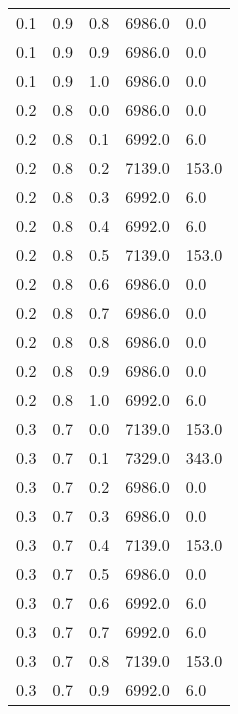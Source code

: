 \begin{longtable}{ l | l | l | l | l}
      0.1&          0.9&          0.8&       6986.0&          0.0\\
      0.1&          0.9&          0.9&       6986.0&          0.0\\
      0.1&          0.9&          1.0&       6986.0&          0.0\\
      0.2&          0.8&          0.0&       6986.0&          0.0\\
      0.2&          0.8&          0.1&       6992.0&          6.0\\
      0.2&          0.8&          0.2&       7139.0&        153.0\\
      0.2&          0.8&          0.3&       6992.0&          6.0\\
      0.2&          0.8&          0.4&       6992.0&          6.0\\
      0.2&          0.8&          0.5&       7139.0&        153.0\\
      0.2&          0.8&          0.6&       6986.0&          0.0\\
      0.2&          0.8&          0.7&       6986.0&          0.0\\
        0.2&          0.8&          0.8&       6986.0&          0.0\\
        0.2&          0.8&          0.9&       6986.0&          0.0\\
        0.2&          0.8&          1.0&       6992.0&          6.0\\
        0.3&          0.7&          0.0&       7139.0&        153.0\\
        0.3&          0.7&          0.1&       7329.0&        343.0\\
        0.3&          0.7&          0.2&       6986.0&          0.0\\
        0.3&          0.7&          0.3&       6986.0&          0.0\\
        0.3&          0.7&          0.4&       7139.0&        153.0\\
        0.3&          0.7&          0.5&       6986.0&          0.0\\
        0.3&          0.7&          0.6&       6992.0&          6.0\\
        0.3&          0.7&          0.7&       6992.0&          6.0\\
        0.3&          0.7&          0.8&       7139.0&        153.0\\
        0.3&          0.7&          0.9&       6992.0&          6.0\\

\end{longtable}
